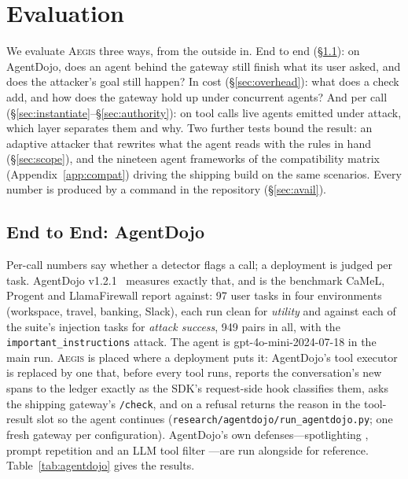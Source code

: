\documentclass[sigconf,nonacm]{acmart}
\newcommand{\system}{\textsc{Aegis}\xspace}
\begin{document}


\section{Evaluation}
\label{sec:eval}

We evaluate \system three ways, from the outside in. End to end
(\S\ref{sec:agentdojo}): on AgentDojo, does an agent behind the gateway
still finish what its user asked, and does the attacker's goal still
happen? In cost (\S\ref{sec:overhead}): what does a check add, and how
does the gateway hold up under concurrent agents? And per call
(\S\ref{sec:instantiate}--\S\ref{sec:authority}): on tool calls live agents emitted under attack, which layer separates them and why. Two further tests bound the result: an adaptive attacker that rewrites what the agent reads with the rules in hand (\S\ref{sec:scope}), and the nineteen agent frameworks of the compatibility matrix (Appendix~\ref{app:compat}) driving the shipping build on the same scenarios. Every number is produced by a command in the repository (\S\ref{sec:avail}).

\subsection{End to End: AgentDojo}
\label{sec:agentdojo}



Per-call numbers say whether a detector flags a call; a deployment is
judged per task. AgentDojo v1.2.1~\cite{debenedetti2024agentsec} measures
exactly that, and is the benchmark CaMeL, Progent and LlamaFirewall
report against: 97 user tasks in four environments (workspace, travel,
banking, Slack), each run clean for \emph{utility} and against each of the
suite's injection tasks for \emph{attack success}, 949 pairs in all, with
the \texttt{important\_\allowbreak instructions} attack. The agent is
gpt-4o-mini-2024-07-18 in the main run. \system is placed where a deployment
puts it: AgentDojo's tool executor is replaced by one that, before every
tool runs, reports the conversation's new spans to the ledger exactly as
the SDK's request-side hook classifies them, asks the shipping gateway's
\texttt{/check}, and on a refusal returns the reason in the tool-result
slot so the agent continues (\texttt{research/agentdojo/run\_agentdojo.py};
one fresh gateway per configuration). AgentDojo's own defenses---spotlighting
\cite{hines2024spotlighting}, prompt repetition and an LLM tool filter
\cite{debenedetti2024agentsec}---are run alongside for reference. Table~\ref{tab:agentdojo} gives the results.
\end{document}
